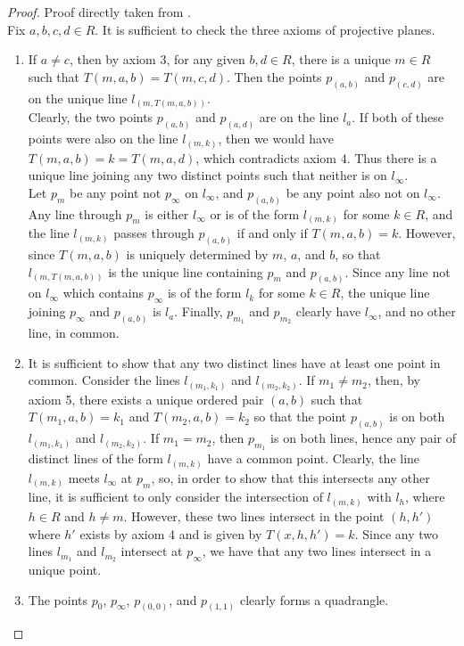 \documentclass{report}
\theoremstyle{definition}\newtheorem*{definition}{Definition}
\theoremstyle{definition}\newtheorem*{example}{Example}
\theoremstyle{remark}\newtheorem*{remark}{Remark}
\begin{document}
\begin{proof}
Proof directly taken from \cite{5}. \\
Fix $ a, b, c, d \in R $. It is sufficient to check the three axioms of projective planes.
\begin{enumerate}
  \item If $ a \ne c $, then by axiom 3, for any given $ b, d \in R $, there is a unique $ m \in R $ such that $ T(m, a, b) = T(m, c, d) $. Then the points $ p_{(a, b)} $ and $ p_{(c, d)} $ are on the unique line $ l_{(m, T(m, a, b))} $. \\
    Clearly, the two points $ p_{(a, b)} $ and $ p_{(a, d)} $ are on the line $ l_a $. If both of these points were also on the line $ l_{(m, k)} $, then we would have $ T(m, a, b) = k = T(m, a, d) $, which contradicts axiom 4. Thus there is a unique line joining any two distinct points such that neither is on $ l_\infty $. \\
    Let $ p_m $ be any point not $ p_\infty $ on $ l_\infty $, and $ p_{(a, b)} $ be any point also not on $ l_\infty $. Any line through $ p_m $ is either $ l_\infty $ or is of the form $ l_{(m, k)} $ for some $ k \in R $, and the line $ l_{(m, k)} $ passes through $ p_{(a, b)} $ if and only if $ T(m, a, b) = k $. However, since $ T(m, a, b) $ is uniquely determined by $ m $, $ a $, and $ b $, so that $ l_{(m, T(m, a, b))} $ is the unique line containing $ p_m $ and $ p_{(a, b)} $. Since any line not on $ l_\infty $ which contains $ p_\infty $ is of the form $ l_k $ for some $ k \in R $, the unique line joining $ p_\infty $ and $ p_{(a, b)} $ is $ l_a $. Finally, $ p_{m_1} $ and $ p_{m_2} $ clearly have $ l_\infty $, and no other line, in common.
  \item It is sufficient to show that any two distinct lines have at least one point in common. Consider the lines $ l_{(m_1, k_1)} $ and $ l_{(m_2, k_2)} $. If $ m_1 \ne m_2 $, then, by axiom 5, there exists a unique ordered pair $ (a, b) $ such that $ T(m_1, a, b) = k_1 $ and $ T(m_2, a, b) = k_2 $ so that the point $ p_{(a, b)} $ is on both $ l_{(m_1, k_1)} $ and $ l_{(m_2, k_2)} $. If $ m_1 = m_2 $, then $ p_{m_1} $ is on both lines, hence any pair of distinct lines of the form $ l_{(m, k)} $ have a common point. Clearly, the line $ l_{(m, k)} $ meets $ l_\infty $ at $ p_m $, so, in order to show that this intersects any other line, it is sufficient to only consider the intersection of $ l_{(m, k)} $ with $ l_h $, where $ h \in R $ and $ h \ne m $. However, these two lines intersect in the point $ (h, h') $ where $ h' $ exists by axiom 4 and is given by $ T(x, h, h') = k $. Since any two lines $ l_{m_1} $ and $ l_{m_2} $ intersect at $ p_\infty $, we have that any two lines intersect in a unique point.
  \item The points $ p_0 $, $ p_\infty $, $ p_{(0, 0)} $, and $ p_{(1, 1)} $ clearly forms a quadrangle.
\end{enumerate}
\end{proof}
\end{document}
